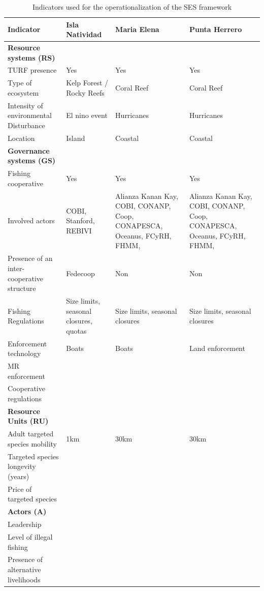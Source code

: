 \documentclass{frontiersSCNS}
\theoremstyle{definition}
\theoremstyle{definition}
\theoremstyle{definition}
\theoremstyle{remark}
\begin{document}
\begin{table}

\caption{\label{tab:unnamed-chunk-4}\label{table:gov_ind}Indicators used for the operationalization of the SES framework \citep{leslie_2015-na}}
\centering
\begin{tabular}[t]{>{\raggedright\arraybackslash}p{10em}|>{\raggedright\arraybackslash}p{8em}|>{\raggedright\arraybackslash}p{8em}|>{\raggedright\arraybackslash}p{8em}}
\hline
Indicator & Isla Natividad & Maria Elena & Punta Herrero\\
\hline
\textbf{Resource systems (RS)} & \textbf{} & \textbf{}\\
\hline
TURF presence & Yes & Yes & Yes\\
\hline
Type of ecosystem & Kelp Forest / Rocky Reefs & Coral Reef & Coral Reef\\
\hline
Intensity of environmental Disturbance & El nino event & Hurricanes & Hurricanes\\
\hline
Location & Island & Coastal & Coastal\\
\hline
\textbf{Governance systems (GS)} & \textbf{} & \textbf{}\\
\hline
Fishing cooperative & Yes & Yes & Yes\\
\hline
Involved actors & COBI, Stanford, REBIVI & Alianza Kanan Kay, COBI, CONANP, Coop, CONAPESCA, Oceanus, FCyRH, FHMM, & Alianza Kanan Kay, COBI, CONANP, Coop, CONAPESCA, Oceanus, FCyRH, FHMM,\\
\hline
Presence of an inter-cooperative structure & Fedecoop & Non & Non\\
\hline
Fishing Regulations & Size limits, seasonal closures, quotas & Size limits, seasonal closures & Size limits, seasonal closures\\
\hline
Enforcement technology & Boats & Boats & Land enforcement\\
\hline
MR enforcement &  &  & \\
\hline
Cooperative regulations &  &  & \\
\hline
\textbf{Resource Units (RU)} & \textbf{} & \textbf{}\\
\hline
Adult targeted species mobility & 1km & 30km & 30km\\
\hline
Targeted species longevity (years) &  &  & \\
\hline
Price of targeted species &  &  & \\
\hline
\textbf{Actors (A)} & \textbf{} & \textbf{}\\
\hline
Leadership &  &  & \\
\hline
Level of illegal fishing & 1 & 1 & 3\\
\hline
Presence of alternative livelihoods &  &  & \\
\hline
\end{tabular}
\end{table}
\end{document}
